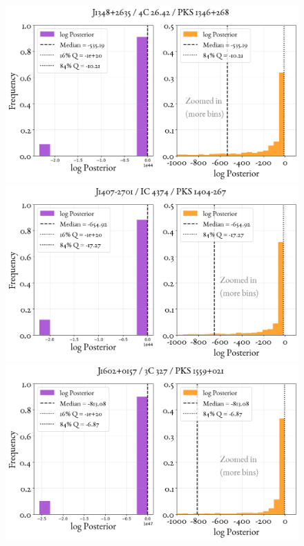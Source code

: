 \begin{figure}
    \centering
    \includegraphics[width=0.8\linewidth]{figures/ResultPosteriors/56_Posterior_4326.png} \\
    \includegraphics[width=0.8\linewidth]{figures/ResultPosteriors/60_Posterior_4364.png}\\
     \includegraphics[width=0.8\linewidth]{figures/ResultPosteriors/67_Posterior_4596.png} 
\end{figure}

